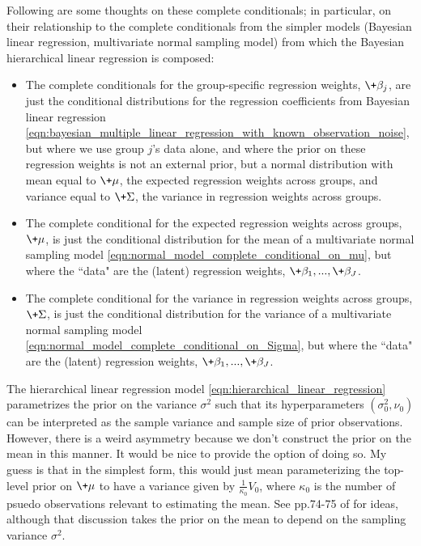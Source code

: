 \documentclass{article} %
\begin{document}
Following are some thoughts on these complete conditionals; in particular,  on their relationship to the complete conditionals from the simpler models (Bayesian linear regression,  multivariate normal sampling model) from which the Bayesian hierarchical linear regression is composed:
\begin{itemize}
\item The complete conditionals for the group-specific regression weights,  $\+\beta_j$,  are just the conditional distributions for the regression coefficients from Bayesian linear regression \eqref{eqn:bayesian_multiple_linear_regression_with_known_observation_noise},  but where we use group $j$'s data alone,  and where the prior on these regression weights is not an external prior,  but a normal distribution with mean equal to $\+\mu$,  the expected regression weights across groups,  and variance equal to $\+\Sigma$,  the variance in regression weights across groups. 
\item The complete conditional  for the expected regression weights across groups,  $\+\mu$,   is just the conditional distribution for the mean of a multivariate normal sampling model \eqref{eqn:normal_model_complete_conditional_on_mu},  but where the ``data" are the (latent) regression weights,  $\+\beta_1, ...,\+\beta_J$. 
\item The complete conditional  for the variance in regression weights across groups,  $\+\Sigma$,   is just the conditional distribution for the variance of a multivariate normal sampling model \eqref{eqn:normal_model_complete_conditional_on_Sigma},  but where the ``data" are the (latent) regression weights, $\+\beta_1, ...,\+\beta_J$. 
\end{itemize}

\begin{question}
The hierarchical linear regression model \eqref{eqn:hierarchical_linear_regression} parametrizes the prior on the variance $\sigma^2$ such that its hyperparameters $(\sigma_0^2,  \nu_0)$ can be interpreted as the sample variance and sample size of prior observations.   However,  there is a weird asymmetry because we don't construct the prior on the mean in this manner.   It would be nice to provide the option of doing so.  	My guess is that in the simplest form,  this would just mean parameterizing the top-level prior on $\+\mu$ to have a variance given by $\frac{1}{\kappa_0} V_0$, where $\kappa_0$ is the number of psuedo observations relevant to estimating the mean.    See pp.74-75 of \cite{hoff2009first} for ideas,  although that discussion takes the prior on the mean to depend on the sampling variance $\sigma^2$.  
\end{question}
\end{document}
